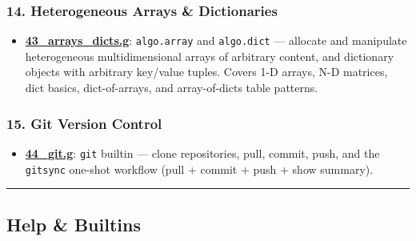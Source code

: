 \documentclass[
]{article}
\providecommand{\tightlist}{%
  \setlength{\itemsep}{0pt}\setlength{\parskip}{0pt}}
\begin{document}
\subsubsection{14. Heterogeneous Arrays \&
Dictionaries}\label{heterogeneous-arrays-dictionaries}

\begin{itemize}
\tightlist
\item
  \textbf{\url{43_arrays_dicts.g}}: \texttt{algo.array} and
  \texttt{algo.dict} --- allocate and manipulate heterogeneous
  multidimensional arrays of arbitrary content, and dictionary objects
  with arbitrary key/value tuples. Covers 1-D arrays, N-D matrices, dict
  basics, dict-of-arrays, and array-of-dicts table patterns.
\end{itemize}

\subsubsection{15. Git Version Control}\label{git-version-control}

\begin{itemize}
\tightlist
\item
  \textbf{\url{44_git.g}}: \texttt{git} builtin --- clone repositories,
  pull, commit, push, and the \texttt{gitsync} one-shot workflow (pull +
  commit + push + show summary).
\end{itemize}

\begin{center}\rule{0.5\linewidth}{0.5pt}\end{center}

\subsection{Help \& Builtins}\label{help-builtins}
\end{document}
